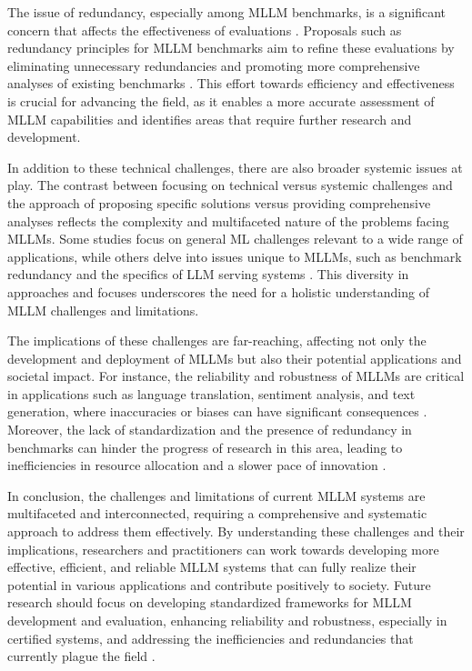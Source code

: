 \documentclass[conference]{IEEEtran}
\begin{document}
The issue of redundancy, especially among MLLM benchmarks, is a significant concern that affects the effectiveness of evaluations \cite{b8}. Proposals such as redundancy principles for MLLM benchmarks aim to refine these evaluations by eliminating unnecessary redundancies and promoting more comprehensive analyses of existing benchmarks \cite{b9}. This effort towards efficiency and effectiveness is crucial for advancing the field, as it enables a more accurate assessment of MLLM capabilities and identifies areas that require further research and development.

In addition to these technical challenges, there are also broader systemic issues at play. The contrast between focusing on technical versus systemic challenges \cite{b10} and the approach of proposing specific solutions versus providing comprehensive analyses \cite{b11} reflects the complexity and multifaceted nature of the problems facing MLLMs. Some studies focus on general ML challenges relevant to a wide range of applications, while others delve into issues unique to MLLMs, such as benchmark redundancy and the specifics of LLM serving systems \cite{b12}. This diversity in approaches and focuses underscores the need for a holistic understanding of MLLM challenges and limitations.

The implications of these challenges are far-reaching, affecting not only the development and deployment of MLLMs but also their potential applications and societal impact. For instance, the reliability and robustness of MLLMs are critical in applications such as language translation, sentiment analysis, and text generation, where inaccuracies or biases can have significant consequences \cite{b13}. Moreover, the lack of standardization and the presence of redundancy in benchmarks can hinder the progress of research in this area, leading to inefficiencies in resource allocation and a slower pace of innovation \cite{b14}.

In conclusion, the challenges and limitations of current MLLM systems are multifaceted and interconnected, requiring a comprehensive and systematic approach to address them effectively. By understanding these challenges and their implications, researchers and practitioners can work towards developing more effective, efficient, and reliable MLLM systems that can fully realize their potential in various applications and contribute positively to society. Future research should focus on developing standardized frameworks for MLLM development and evaluation, enhancing reliability and robustness, especially in certified systems, and addressing the inefficiencies and redundancies that currently plague the field \cite{b15}.
\end{document}
